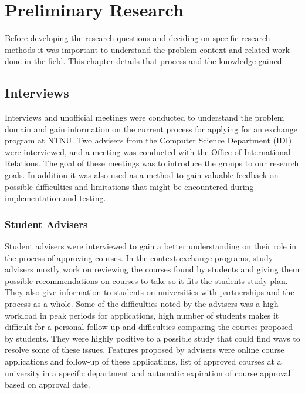 \chapter{Preliminary Research} \label{chap:2}
Before developing the research questions and deciding on specific research methods it was important to understand the problem context and related work done in the field. This chapter details that process and the knowledge gained.  

\section{Interviews}
Interviews and unofficial meetings were conducted to understand the problem domain and gain information on the current process for applying for an exchange program at NTNU. Two advisers from the Computer Science Department (IDI) were interviewed, and a meeting was conducted with the Office of International Relations. The goal of these meetings was to introduce the groups to our research goals. In addition it was also used as a method to gain valuable feedback on possible difficulties and limitations that might be encountered during implementation and testing. 

\subsection{Student Advisers} Student advisers were interviewed to gain a better understanding on their role in the process of approving courses. In the context exchange programs, study advisers mostly work on reviewing the courses found by students and giving them possible recommendations on courses to take so it fits the students study plan. They also give information to students on universities with partnerships and the process as a whole. Some of the difficulties noted by the advisers was a high workload in peak periods for applications, high number of students makes it difficult for a personal follow-up and difficulties comparing the courses proposed by students. They were highly positive to a possible study that could find ways to resolve some of these issues. Features proposed by advisers were online course applications and follow-up of these applications, list of approved courses at a university in a specific department and automatic expiration of course approval based on approval date. 

